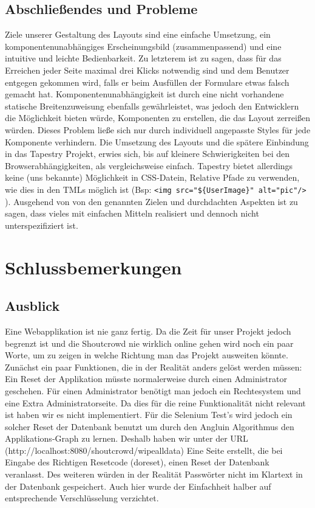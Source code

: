 \documentclass[12pt,a4paper]{article}
\begin{document}
\subsection{Abschließendes und Probleme}
Ziele unserer Gestaltung des Layouts sind eine einfache Umsetzung, ein komponentenunabhängiges Erscheinungsbild (zusammenpassend) und eine intuitive und leichte Bedienbarkeit. Zu letzterem ist zu sagen, dass für das Erreichen jeder Seite maximal drei Klicks notwendig sind und dem Benutzer entgegen gekommen wird, falls er beim Ausfüllen der Formulare etwas falsch gemacht hat. Komponentenunabhängigkeit ist durch eine nicht vorhandene statische Breitenzuweisung ebenfalls gewährleistet, was jedoch den Entwicklern die Möglichkeit bieten würde, Komponenten zu erstellen, die das Layout zerreißen würden. Dieses Problem ließe sich nur durch individuell angepasste Styles für jede Komponente verhindern. Die Umsetzung des Layouts und die spätere Einbindung in das Tapestry Projekt, erwies sich, bis auf kleinere Schwierigkeiten bei den Browserabhängigkeiten, als vergleichsweise einfach. Tapestry bietet allerdings keine (uns bekannte) Möglichkeit in CSS-Datein, Relative Pfade zu verwenden, wie dies in den TMLs möglich ist (Bsp:  \verb+<img src="${UserImage}" alt="pic"/>+ ). Ausgehend von von den genannten Zielen und durchdachten Aspekten ist zu sagen, dass vieles mit einfachen Mitteln realisiert und dennoch nicht unterspezifiziert ist. 

\newpage
\section{Schlussbemerkungen}

\subsection{Ausblick}
Eine Webapplikation ist nie ganz fertig. Da die Zeit für unser Projekt jedoch begrenzt ist und die Shoutcrowd nie wirklich online gehen wird noch ein paar Worte, um zu zeigen in welche Richtung man das Projekt ausweiten könnte. Zunächst ein paar Funktionen, die in der Realität anders gelöst werden müssen:
Ein Reset der Applikation müsste normalerweise durch einen Administrator geschehen. Für einen Administrator benötigt man jedoch ein Rechtesystem und eine Extra Administratorseite. Da dies  für die reine Funktionalität nicht relevant ist haben wir es nicht implementiert. Für die Selenium Test's wird jedoch ein solcher Reset der Datenbank benutzt um durch den Angluin Algorithmus den Applikations-Graph zu lernen. Deshalb haben wir unter der URL (http://localhost:8080/shoutcrowd/wipealldata)
Eine Seite erstellt, die bei Eingabe des Richtigen Resetcode (doreset), einen Reset der Datenbank veranlasst. Des weiteren würden in der Realität Passwörter nicht im Klartext in der Datenbank gespeichert. Auch hier wurde der Einfachheit halber auf entsprechende Verschlüsselung verzichtet.
\end{document}
